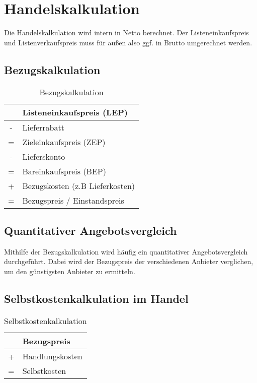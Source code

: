 \section{Handelskalkulation}

Die Handelskalkulation wird intern in Netto berechnet. Der Listeneinkaufspreis und Listenverkaufspreis muss für außen also ggf. in Brutto umgerechnet werden.

\subsection{Bezugskalkulation}

\begin{table}[H]
    \centering
    \begin{tabular}{c|l}
          & Listeneinkaufspreis (LEP)       \\
        \hline
        - & Lieferrabatt                    \\
        \hline
        = & Zieleinkaufspreis (ZEP)         \\
        \hline
        - & Lieferskonto                    \\
        \hline
        = & Bareinkaufspreis (BEP)          \\
        \hline
        + & Bezugskosten (z.B Lieferkosten) \\
        \hline
        = & Bezugspreis / Einstandspreis    \\
    \end{tabular}
    \caption{Bezugskalkulation}
\end{table}

\subsection{Quantitativer Angebotsvergleich}

Mithilfe der Bezugskalkulation wird häufig ein quantitativer Angebotsvergleich durchgeführt. Dabei wird der Bezugspreis der verschiedenen Anbieter verglichen, um den günstigsten Anbieter zu ermitteln.

\subsection{Selbstkostenkalkulation im Handel}

\begin{table}[H]
    \centering
    \begin{tabular}{c|l}
          & Bezugspreis     \\
        \hline
        + & Handlungskosten \\
        \hline
        = & Selbstkosten    \\
    \end{tabular}
    \caption{Selbstkostenkalkulation}
\end{table}

